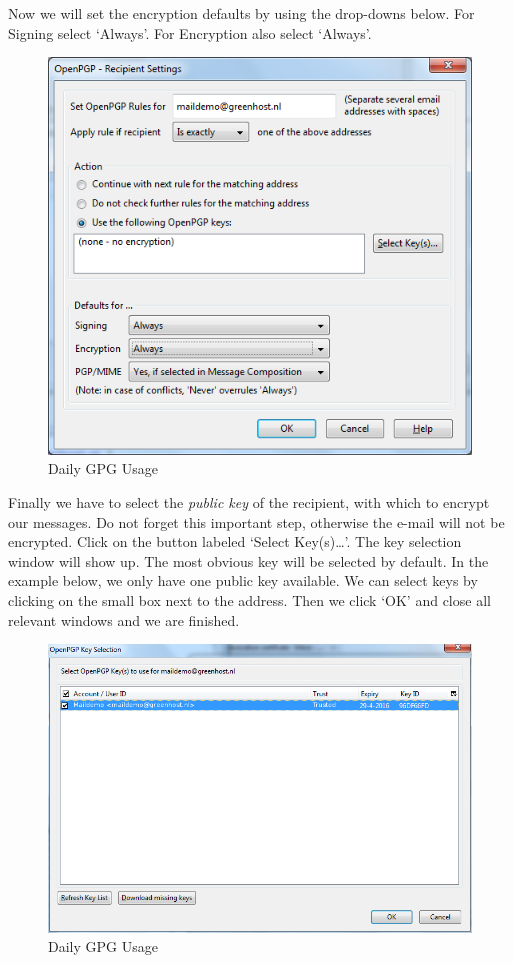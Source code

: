 Now we will set the encryption defaults by using the drop-downs below.
For Signing select `Always'. For Encryption also select `Always'.

\begin{figure}[htbp]
\centering
\includegraphics{daily_gpg_28.png}
\caption{Daily GPG Usage}
\end{figure}

Finally we have to select the \emph{public key} of the recipient, with
which to encrypt our messages. Do not forget this important step,
otherwise the e-mail will not be encrypted. Click on the button labeled
`Select Key(s)\ldots{}'. The key selection window will show up. The most
obvious key will be selected by default. In the example below, we only
have one public key available. We can select keys by clicking on the
small box next to the address. Then we click `OK' and close all relevant
windows and we are finished.

\begin{figure}[htbp]
\centering
\includegraphics{daily_gpg_29.png}
\caption{Daily GPG Usage}
\end{figure}

